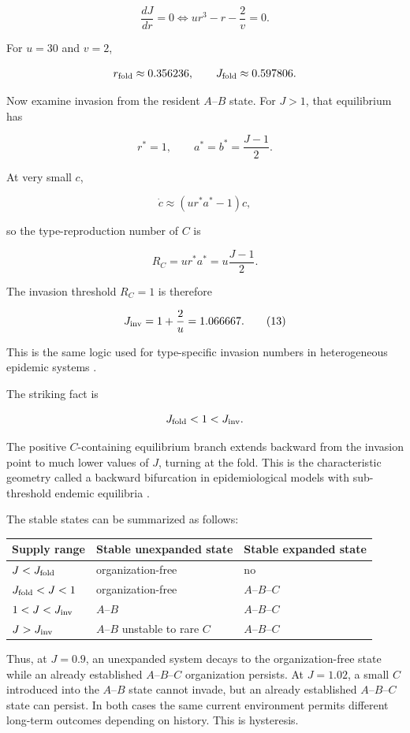 \documentclass[11pt,a4paper]{article}
\begin{document}
\[
\frac{dJ}{dr}=0 \iff ur^3 - r - \frac{2}{v} = 0.
\]

For \(u=30\) and \(v=2\),

\[
r_{\rm fold} \approx 0.356236, \qquad J_{\rm fold} \approx 0.597806.
\]

Now examine invasion from the resident \(A\)--\(B\) state. For \(J>1\),
that equilibrium has

\[
r^*=1, \qquad a^*=b^*=\frac{J-1}{2}.
\]

At very small \(c\),

\[
\dot c \approx (ur^*a^*-1)c,
\]

so the type-reproduction number of \(C\) is

\[
R_C = ur^*a^* = u\frac{J-1}{2}.
\]

The invasion threshold \(R_C=1\) is therefore

\[
J_{\rm inv} = 1+\frac{2}{u} = 1.066667. \tag{13}
\]

This is the same logic used for type-specific invasion numbers in
heterogeneous epidemic systems \citep{Heesterbeek2007}.

The striking fact is

\[
J_{\rm fold} < 1 < J_{\rm inv}.
\]

The positive \(C\)-containing equilibrium branch extends backward from
the invasion point to much lower values of \(J\), turning at the fold.
This is the characteristic geometry called a backward bifurcation in
epidemiological models with sub-threshold endemic equilibria
\citep{KribsZaleta2000, VandenDriessche2002}.

The stable states can be summarized as follows:

\begin{longtable}[]{@{}lll@{}}
\toprule\noalign{}
Supply range & Stable unexpanded state & Stable expanded state \\
\midrule\noalign{}
\endhead
\bottomrule\noalign{}
\endlastfoot
\(J < J_{\rm fold}\) & organization-free & no \\
\(J_{\rm fold} < J < 1\) & organization-free & \(A\)--\(B\)--\(C\) \\
\(1 < J < J_{\rm inv}\) & \(A\)--\(B\) & \(A\)--\(B\)--\(C\) \\
\(J > J_{\rm inv}\) & \(A\)--\(B\) unstable to rare \(C\) &
\(A\)--\(B\)--\(C\) \\
\end{longtable}

Thus, at \(J=0.9\), an unexpanded system decays to the organization-free
state while an already established \(A\)--\(B\)--\(C\) organization
persists. At \(J=1.02\), a small \(C\) introduced into the \(A\)--\(B\)
state cannot invade, but an already established \(A\)--\(B\)--\(C\)
state can persist. In both cases the same current environment permits
different long-term outcomes depending on history. This is hysteresis.
\end{document}
